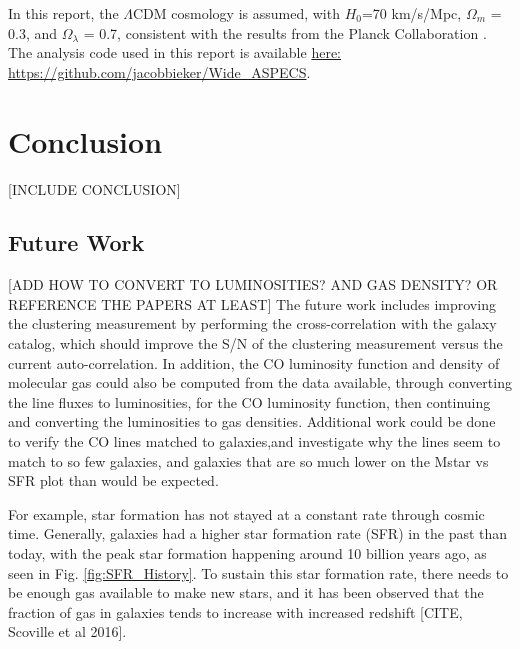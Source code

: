 \documentclass[twoside,single]{lion-msc}
\begin{document}
In this report, the $\Lambda$CDM cosmology is assumed, with $H_0$=70 km/s/Mpc, $\Omega_m$ = 0.3, and $\Omega_{\lambda}$ = 0.7, consistent with the results from the Planck Collaboration \cite{ade2016planck}. The analysis code used in this report is available \href{https://github.com/jacobbieker/Wide\_ASPECS}{here: https://github.com/jacobbieker/Wide\_ASPECS}. 





\chapter{Conclusion}

[INCLUDE CONCLUSION]

\section{Future Work}

[ADD HOW TO CONVERT TO LUMINOSITIES? AND GAS DENSITY? OR REFERENCE THE PAPERS AT LEAST]
The future work includes improving the clustering measurement by performing the cross-correlation with the galaxy catalog, which should improve the S/N of the clustering measurement versus the current auto-correlation. In addition, the CO luminosity function and density of molecular gas could also be computed from the data available, through converting the line fluxes to luminosities, for the CO luminosity function, then continuing and converting the luminosities to gas densities. Additional work could be done to verify the CO lines matched to galaxies,and investigate why the lines seem to match to so few galaxies, and galaxies that are so much lower on the Mstar vs SFR plot than would be expected. 

\appendix


For example, star formation has not stayed at a constant rate through cosmic time. Generally, galaxies had a higher star formation rate (SFR) in the past than today, with the peak star formation happening around 10 billion years ago, as seen in Fig. \ref{fig:SFR_History}. To sustain this star formation rate, there needs to be enough gas available to make new stars, and it has been observed that the fraction of gas in galaxies tends to increase with increased redshift [CITE, Scoville et al 2016]. 
\end{document}
